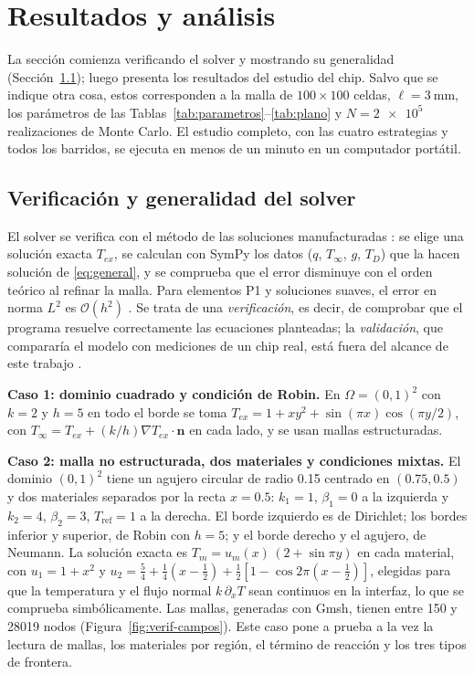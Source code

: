 \documentclass[preprint,11pt,sort&compress]{elsarticle}
\renewcommand{\vec}[1]{\bm{#1}}
\begin{document}
\section{Resultados y análisis}
\label{sec:resultados}

La sección comienza verificando el solver y mostrando su generalidad
(Sección~\ref{sec:verif}); luego presenta los resultados del estudio del chip. Salvo que se
indique otra cosa, estos corresponden a la malla de $100\times100$ celdas,
$\ell=\SI{3}{\milli\metre}$, los parámetros de las
Tablas~\ref{tab:parametros}--\ref{tab:plano} y $N=\num{2e5}$ realizaciones de Monte Carlo.
El estudio completo, con las cuatro estrategias y todos los barridos, se ejecuta en menos
de un minuto en un computador portátil.

\subsection{Verificación y generalidad del solver}
\label{sec:verif}

El solver se verifica con el método de las soluciones manufacturadas
\cite{roache2002mms,oberkampf2010vv}: se elige una solución exacta $T_{ex}$, se calculan
con SymPy los datos ($q$, $T_\infty$, $g$, $T_D$) que la hacen solución de
\eqref{eq:general}, y se comprueba que el error disminuye con el orden teórico al refinar
la malla. Para elementos P1 y soluciones suaves, el error en norma $L^2$ es
$\mathcal O(h^2)$ \cite{larson2013fem}. Se trata de una \emph{verificación}, es decir,
de comprobar que el programa resuelve correctamente las ecuaciones planteadas; la
\emph{validación}, que compararía el modelo con mediciones de un chip real, está fuera del
alcance de este trabajo \cite{oberkampf2010vv}.

\textbf{Caso 1: dominio cuadrado y condición de Robin.} En $\Omega=(0,1)^2$ con $k=2$ y
$h=5$ en todo el borde se toma
$T_{ex}=1+xy^2+\sin(\pi x)\cos(\pi y/2)$, con $T_\infty=T_{ex}+(k/h)\nabla T_{ex}\cdot\vec n$
en cada lado, y se usan mallas estructuradas.

\textbf{Caso 2: malla no estructurada, dos materiales y condiciones mixtas.} El dominio
$(0,1)^2$ tiene un agujero circular de radio \num{0.15} centrado en $(\num{0.75},\num{0.5})$
y dos materiales separados por la recta $x=\num{0.5}$: $k_1=1$, $\beta_1=0$ a la izquierda
y $k_2=4$, $\beta_2=3$, $T_{\mathrm{ref}}=1$ a la derecha. El borde izquierdo es de
Dirichlet; los bordes inferior y superior, de Robin con $h=5$; y el borde derecho y el
agujero, de Neumann. La solución exacta es $T_m=u_m(x)\,(2+\sin\pi y)$ en cada material, con
$u_1=1+x^2$ y
$u_2=\tfrac54+\tfrac14\left(x-\tfrac12\right)+\tfrac12\left[1-\cos 2\pi\left(x-\tfrac12\right)\right]$,
elegidas para que la temperatura y el flujo normal $k\,\partial_xT$ sean continuos en la
interfaz, lo que se comprueba simbólicamente. Las mallas, generadas con Gmsh, tienen
entre 150 y \num{28019} nodos (Figura~\ref{fig:verif-campos}). Este caso pone a prueba a la
vez la lectura de mallas, los materiales por región, el término de reacción y los tres
tipos de frontera.
\end{document}
